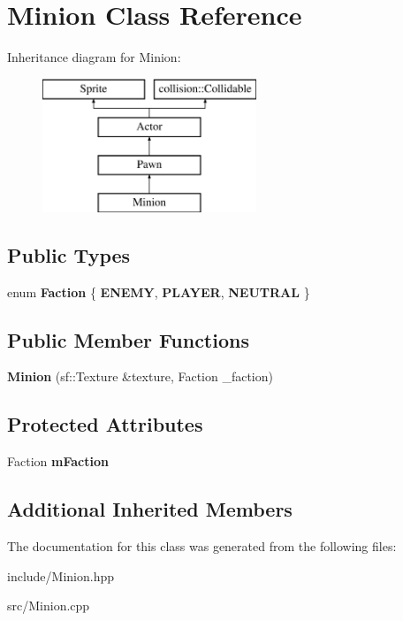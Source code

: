 \hypertarget{class_minion}{}\section{Minion Class Reference}
\label{class_minion}
Inheritance diagram for Minion\+:\begin{figure}[H]
\begin{center}
\leavevmode
\includegraphics[height=4.000000cm]{class_minion}
\end{center}
\end{figure}
\subsection*{Public Types}
\begin{DoxyCompactItemize}
\item 
\hypertarget{class_minion_a28c5affe4b9c8a1d7591561a22555c93}{}enum {\bfseries Faction} \{ {\bfseries E\+N\+E\+M\+Y}, 
{\bfseries P\+L\+A\+Y\+E\+R}, 
{\bfseries N\+E\+U\+T\+R\+A\+L}
 \}\label{class_minion_a28c5affe4b9c8a1d7591561a22555c93}

\end{DoxyCompactItemize}
\subsection*{Public Member Functions}
\begin{DoxyCompactItemize}
\item 
\hypertarget{class_minion_a4d4205a51cf41111decbdb8c0807dd21}{}{\bfseries Minion} (sf\+::\+Texture \&texture, Faction \+\_\+faction)\label{class_minion_a4d4205a51cf41111decbdb8c0807dd21}

\end{DoxyCompactItemize}
\subsection*{Protected Attributes}
\begin{DoxyCompactItemize}
\item 
\hypertarget{class_minion_a9ec9cafd50e0a013a7a94e97726c5963}{}Faction {\bfseries m\+Faction}\label{class_minion_a9ec9cafd50e0a013a7a94e97726c5963}

\end{DoxyCompactItemize}
\subsection*{Additional Inherited Members}


The documentation for this class was generated from the following files\+:\begin{DoxyCompactItemize}
\item 
include/Minion.\+hpp\item 
src/Minion.\+cpp\end{DoxyCompactItemize}

